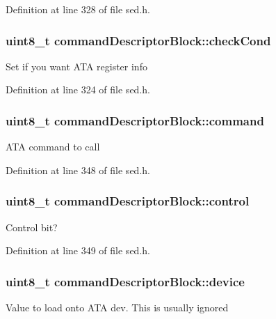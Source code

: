 Definition at line 328 of file sed.\+h.

\hypertarget{structcommandDescriptorBlock_a8d174a9a3024662d102a749c00cca1be}{
\subsubsection[{check\+Cond}]{\setlength{\rightskip}{0pt plus 5cm}uint8\+\_\+t command\+Descriptor\+Block\+::check\+Cond}}\label{structcommandDescriptorBlock_a8d174a9a3024662d102a749c00cca1be}
Set if you want A\+T\+A register info 

Definition at line 324 of file sed.\+h.

\hypertarget{structcommandDescriptorBlock_ab3763a8225a9c677c95f6253b789ad70}{
\subsubsection[{command}]{\setlength{\rightskip}{0pt plus 5cm}uint8\+\_\+t command\+Descriptor\+Block\+::command}}\label{structcommandDescriptorBlock_ab3763a8225a9c677c95f6253b789ad70}
A\+T\+A command to call 

Definition at line 348 of file sed.\+h.

\hypertarget{structcommandDescriptorBlock_ac8314ebf9163ee2e6682ed3e02f4edd8}{
\subsubsection[{control}]{\setlength{\rightskip}{0pt plus 5cm}uint8\+\_\+t command\+Descriptor\+Block\+::control}}\label{structcommandDescriptorBlock_ac8314ebf9163ee2e6682ed3e02f4edd8}
Control bit? 

Definition at line 349 of file sed.\+h.

\hypertarget{structcommandDescriptorBlock_a41685417208b97377497f29759516529}{
\subsubsection[{device}]{\setlength{\rightskip}{0pt plus 5cm}uint8\+\_\+t command\+Descriptor\+Block\+::device}}\label{structcommandDescriptorBlock_a41685417208b97377497f29759516529}
Value to load onto A\+T\+A dev. This is usually ignored 

